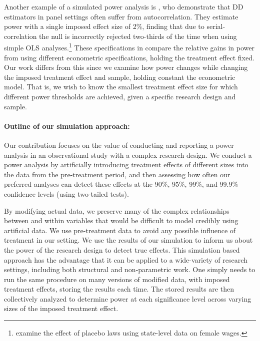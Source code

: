 \documentclass[12pt]{article}%
\begin{document}
Another example of a simulated power analysis is \citet{Bertrand2004}, who demonstrate that DD estimators in panel settings often suffer from autocorrelation. 
They estimate power with a single imposed effect size of 2\%, finding that  due to serial-correlation the null is incorrectly rejected two-thirds of the time when using simple OLS analyses.\footnote{\citet{Bertrand2004} examine the effect of placebo laws using state-level data on female wages.}
These specifications in \citet{Bertrand2004} compare the relative gains in power from using different econometric specifications, holding the treatment effect fixed. 
Our work differs from this since we examine how power changes while changing the imposed treatment effect and sample, holding constant the econometric model.
That is, we wish to know the smallest treatment effect size for which different power thresholds are achieved,  given a specific research design and sample. 

\paragraph{Outline of our simulation approach: }
Our contribution focuses on the value of conducting and reporting a power analysis in an observational study with a complex research design. 
We conduct a power analysis by artificially introducing treatment effects of different sizes into the data from the pre-treatment period, and then assessing how often our preferred analyses can detect these effects at the 90\%, 95\%, 99\%, and 99.9\% confidence levels (using two-tailed tests). 

By modifying actual data, we preserve many of the complex relationships between and within variables that would be difficult to model credibly using artificial data.  
We use pre-treatment data to avoid any possible influence of treatment in our setting. 
We use the results of our simulation to inform us about the power of the research design to detect true effects. 
This simulation based approach has the advantage that it can be applied to a wide-variety of research settings, including both structural and non-parametric work. 
One simply needs to run the same procedure on many versions of modified data, with imposed treatment effects, storing the results each time.  
The stored results are then collectively analyzed to determine power at each significance level across varying sizes of the imposed treatment effect.  
\end{document}
